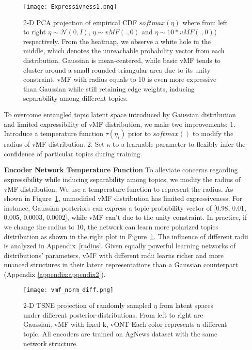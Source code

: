 \documentclass[11pt]{article}
\begin{document}
\begin{figure}
\hspace*{-2.5em}\texttt{[image: Expressivness1.png]}

\caption{2-D PCA projection of empirical CDF $softmax(\eta)$ where from left to right $\eta \sim \mathcal{N}(0, I)$, $\eta \sim vMF(.,0)$ and  $\eta \sim 10 * vMF(.,0)$) respectively. From the heatmap, we observe a white hole in the middle, which denotes the unreachable probability vector from each distribution. Gaussian is mean-centered, while basic vMF tends to cluster around a small rounded triangular area due to its unity constraint. vMF with radius equals to 10 is even more expressive than Gaussian while still retaining edge weights, inducing separability among different topics.} 
\label{fig:1}
\end{figure}


To overcome entangled topic latent space introduced by Gaussian distribution and limited expressibility of vMF distribution, we make two improvements: 1. Introduce a temperature function $\tau(\eta_{i})$ prior to $softmax()$ to modify the radius of vMF distribution. 2. Set $\kappa$ to a learnable parameter to flexibly infer the confidence of particular topics during training. 


\textbf{Encoder Network Temperature Function}
To alleviate concerns regarding expressibility while inducing separability among topics, we modify the radius of vMF distribution. We use a temperature function to represent the radius.  As shown in Figure~\ref{fig:1}, unmodified vMF distribution has limited expressiveness. For instance, Gaussian posteriors can express a topic probability vector of [0.98, 0.01, 0.005, 0.0003, 0.0002], while vMF can't due to the unity constraint. In practice, if we change the radius to 10, the network can learn more polarized topics distribution as shown in the right plot in Figure~\ref{fig:1}. The influence of different radii is analyzed in Appendix~\ref{radius}. Given equally powerful learning networks of distributions' parameters, vMF with different radii learns richer and more nuanced structures in their latent representations than a Gaussian counterpart (Appendix \ref{appendix:appendix2}). 

\begin{figure}
\hspace*{-2.6 em}\texttt{[image: vmf\_norm\_diff.png]}

\caption{2-D TSNE projection of randomly sampled $\eta$ from latent spaces under different posterior-distributions. From left to right are Gaussian, vMF with fixed k, vONT Each color represents a different topic. All encoders are trained on AgNews dataset with the same network structure. }
\label{fig:2}
\end{figure}
\end{document}
